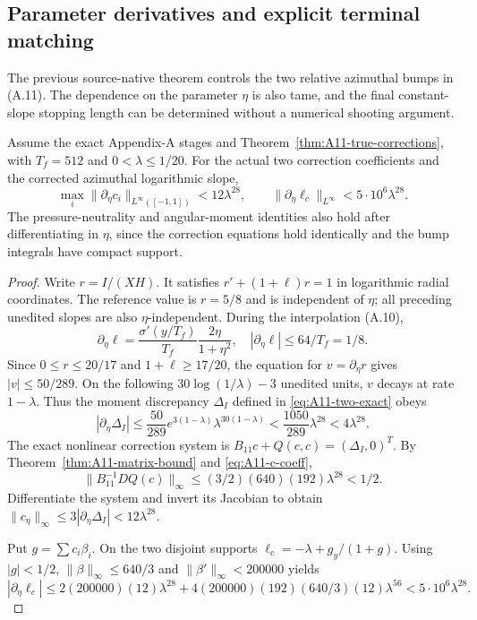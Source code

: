 \subsection*{Parameter derivatives and explicit terminal matching}
\label{subsec:A11-deriv-stop}
The previous source-native theorem controls the two relative
azimuthal bumps in (A.11). The dependence on the parameter $\eta$
is also tame, and the final constant-slope stopping length can be
determined without a numerical shooting argument.

\begin{proposition}
\label{prop:A11-eta-derivative}
Assume the exact Appendix-A stages and Theorem~\ref{thm:A11-true-corrections},
with $T_f=512$ and $0<\lambda\le1/20$. For the actual two correction
coefficients and the corrected azimuthal logarithmic slope,
\[
 \max_i\|\partial_\eta c_i\|_{L^\infty([-1,1])}
 <12\lambda^{28},\qquad
 \|\partial_\eta\ell_c\|_{L^\infty}<5\cdot10^6\lambda^{28}.
\]
The pressure-neutrality and angular-moment identities also
hold after differentiating in $\eta$, since the correction equations
hold identically and the bump integrals have compact support.
\end{proposition}
\begin{proof}
Write $r=I/(XH)$. It satisfies $r'+(1+\ell)r=1$ in logarithmic
radial coordinates. The reference value is $r=5/8$ and is
independent of $\eta$; all preceding unedited slopes are also
$\eta$-independent. During the interpolation (A.10),
\[
 \partial_\eta\ell
 =\frac{\sigma'(y/T_f)}{T_f}\frac{2\eta}{1+\eta^2},
 \quad |\partial_\eta\ell|\le64/T_f=1/8.
\]
Since $0\le r\le20/17$ and $1+\ell\ge17/20$, the
equation for $v=\partial_\eta r$ gives $|v|\le50/289$.
On the following $30\log(1/\lambda)-3$ unedited units,
$v$ decays at rate $1-\lambda$. Thus the moment discrepancy
$\Delta_I$ defined in \eqref{eq:A11-two-exact} obeys
\[
 |\partial_\eta\Delta_I|\le\frac{50}{289}
 e^{3(1-\lambda)}\lambda^{30(1-\lambda)}
 <\frac{1050}{289}\lambda^{28}<4\lambda^{28}.
\]
The exact nonlinear correction system is $B_{11}c+Q(c,c)
=(\Delta_I,0)^T$. By Theorem~\ref{thm:A11-matrix-bound}
and \eqref{eq:A11-c-coeff},
\[
 \|B_{11}^{-1}DQ(c)\|_\infty
 \le(3/2)(640)(192)\lambda^{28}<1/2.
\]
Differentiate the system and invert its Jacobian to obtain
$\|c_\eta\|_\infty\le3|\partial_\eta\Delta_I|
<12\lambda^{28}$.

Put $g=\sum c_i\beta_i$. On the two disjoint supports
$\ell_c=-\lambda+g_y/(1+g)$.
Using $|g|<1/2$, $\|\beta\|_\infty\le640/3$ and
$\|\beta'\|_\infty<200000$ yields
\[
 |\partial_\eta\ell_c|\le
 2(200000)(12)\lambda^{28}
 +4(200000)(192)(640/3)(12)\lambda^{56}
 <5\cdot10^6\lambda^{28}.
\]
\end{proof}

